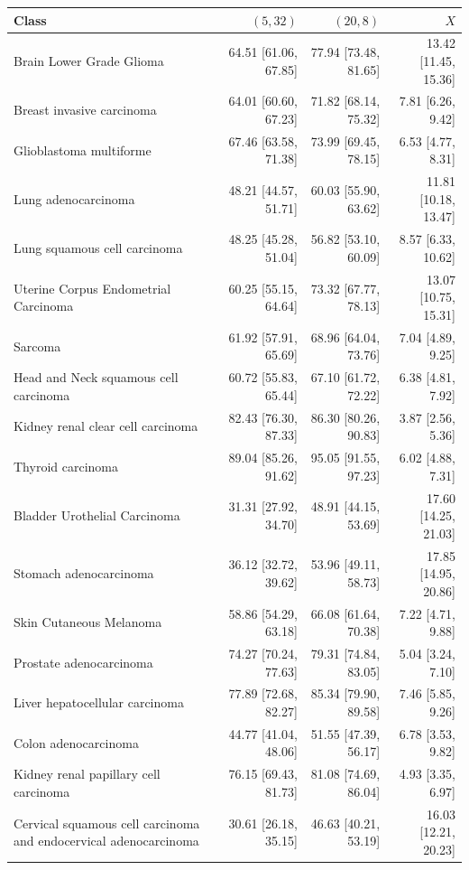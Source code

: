 \begin{tabular}{@{}p{6cm}rrr@{}}
\toprule
Class & $(5, 32)$ & $(20, 8)$ & $X$ \\
\midrule
Brain Lower Grade Glioma & 64.51 [61.06, 67.85] & 77.94 [73.48, 81.65] & 13.42 [11.45, 15.36] \\
Breast invasive carcinoma & 64.01 [60.60, 67.23] & 71.82 [68.14, 75.32] & 7.81 [6.26, 9.42] \\
Glioblastoma multiforme & 67.46 [63.58, 71.38] & 73.99 [69.45, 78.15] & 6.53 [4.77, 8.31] \\
Lung adenocarcinoma & 48.21 [44.57, 51.71] & 60.03 [55.90, 63.62] & 11.81 [10.18, 13.47] \\
Lung squamous cell carcinoma & 48.25 [45.28, 51.04] & 56.82 [53.10, 60.09] & 8.57 [6.33, 10.62] \\
Uterine Corpus Endometrial Carcinoma & 60.25 [55.15, 64.64] & 73.32 [67.77, 78.13] & 13.07 [10.75, 15.31] \\
Sarcoma & 61.92 [57.91, 65.69] & 68.96 [64.04, 73.76] & 7.04 [4.89, 9.25] \\
Head and Neck squamous cell carcinoma & 60.72 [55.83, 65.44] & 67.10 [61.72, 72.22] & 6.38 [4.81, 7.92] \\
Kidney renal clear cell carcinoma & 82.43 [76.30, 87.33] & 86.30 [80.26, 90.83] & 3.87 [2.56, 5.36] \\
Thyroid carcinoma & 89.04 [85.26, 91.62] & 95.05 [91.55, 97.23] & 6.02 [4.88, 7.31] \\
Bladder Urothelial Carcinoma & 31.31 [27.92, 34.70] & 48.91 [44.15, 53.69] & 17.60 [14.25, 21.03] \\
Stomach adenocarcinoma & 36.12 [32.72, 39.62] & 53.96 [49.11, 58.73] & 17.85 [14.95, 20.86] \\
Skin Cutaneous Melanoma & 58.86 [54.29, 63.18] & 66.08 [61.64, 70.38] & 7.22 [4.71, 9.88] \\
Prostate adenocarcinoma & 74.27 [70.24, 77.63] & 79.31 [74.84, 83.05] & 5.04 [3.24, 7.10] \\
Liver hepatocellular carcinoma & 77.89 [72.68, 82.27] & 85.34 [79.90, 89.58] & 7.46 [5.85, 9.26] \\
Colon adenocarcinoma & 44.77 [41.04, 48.06] & 51.55 [47.39, 56.17] & 6.78 [3.53, 9.82] \\
Kidney renal papillary cell carcinoma & 76.15 [69.43, 81.73] & 81.08 [74.69, 86.04] & 4.93 [3.35, 6.97] \\
Cervical squamous cell carcinoma and endocervical adenocarcinoma & 30.61 [26.18, 35.15] & 46.63 [40.21, 53.19] & 16.03 [12.21, 20.23] \\

\end{tabular}
